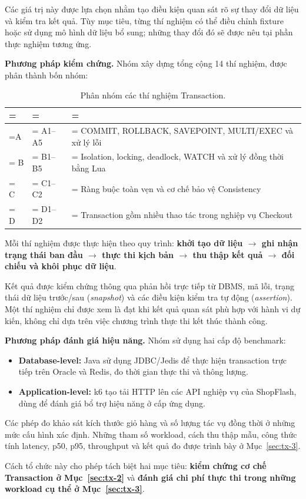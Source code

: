 Các giá trị này được lựa chọn nhằm tạo điều kiện quan sát rõ sự thay đổi dữ liệu và kiểm tra kết quả. Tùy mục tiêu, từng thí nghiệm có thể điều chỉnh fixture hoặc sử dụng mô hình dữ liệu bổ sung; những thay đổi đó sẽ được nêu tại phần thực nghiệm tương ứng.

\textbf{Phương pháp kiểm chứng.} Nhóm xây dựng tổng cộng 14 thí nghiệm, được phân thành bốn nhóm:

\begin{table}[!htbp]
\centering
\caption{Phân nhóm các thí nghiệm Transaction.}\label{tab:tx-2}
\reporttablesetup
\begin{tabularx}{\linewidth}{|>{\hsize\linewidth=\hsize}L|>{\hsize\linewidth=\hsize}L|>{\hsize\linewidth=\hsize}L|}
\hline
{}
 &  &  \\ \hline
A & A1–A5 & COMMIT, ROLLBACK, SAVEPOINT, MULTI/EXEC và xử lý lỗi \\ \hline
B & B1–B5 & Isolation, locking, deadlock, WATCH và xử lý đồng thời bằng Lua \\ \hline
C & C1–C2 & Ràng buộc toàn vẹn và cơ chế bảo vệ Consistency \\ \hline
D & D1–D2 & Transaction gồm nhiều thao tác trong nghiệp vụ Checkout \\ \hline
\end{tabularx}
\end{table}
Mỗi thí nghiệm được thực hiện theo quy trình: \textbf{khởi tạo dữ liệu \(\rightarrow\) ghi nhận trạng thái ban đầu \(\rightarrow\) thực thi kịch bản \(\rightarrow\) thu thập kết quả \(\rightarrow\) đối chiếu và khôi phục dữ liệu}.

Kết quả được kiểm chứng thông qua phản hồi trực tiếp từ DBMS, mã lỗi, trạng thái dữ liệu trước/sau (\emph{snapshot}) và các điều kiện kiểm tra tự động (\emph{assertion}). Một thí nghiệm chỉ được xem là đạt khi kết quả quan sát phù hợp với hành vi dự kiến, không chỉ dựa trên việc chương trình thực thi kết thúc thành công.

\textbf{Phương pháp đánh giá hiệu năng.} Nhóm sử dụng hai cấp độ benchmark:

\begin{itemize}[leftmargin=*,itemsep=2pt,topsep=4pt]
\item
\textbf{Database-level:} Java sử dụng JDBC/Jedis để thực hiện transaction trực tiếp trên Oracle và Redis, đo thời gian thực thi và thông lượng.

\item
\textbf{Application-level:} k6 tạo tải HTTP lên các API nghiệp vụ của ShopFlash, dùng để đánh giá bổ trợ hiệu năng ở cấp ứng dụng.

\end{itemize}
Các phép đo khảo sát kích thước giỏ hàng và số lượng tác vụ đồng thời ở những mức cấu hình xác định. Những tham số workload, cách thu thập mẫu, công thức tính latency, p50, p95, throughput và kết quả đo được trình bày ở Mục~\ref{sec:tx-3}.

Cách tổ chức này cho phép tách biệt hai mục tiêu: \textbf{kiểm chứng cơ chế Transaction ở Mục~\ref{sec:tx-2}} và \textbf{đánh giá chi phí thực thi trong những workload cụ thể ở Mục~\ref{sec:tx-3}}.
